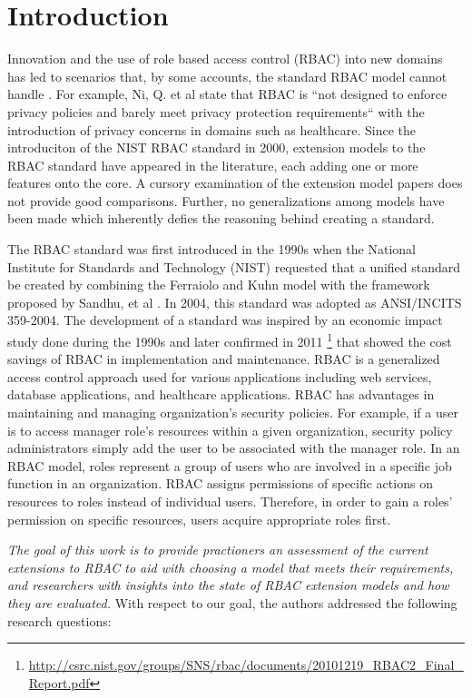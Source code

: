 \section{Introduction} \label{sec:introduction}

Innovation and the use of role based access control (RBAC) into new domains has led to scenarios that, by some accounts, the standard RBAC model cannot handle \cite{kuhn2010adding}.  
For example, Ni, Q. et al \cite{ni2010privacy} state that RBAC is ``not designed to enforce privacy policies and barely 
meet privacy protection requirements`` with the introduction of privacy concerns in domains such as healthcare. 
Since the introduciton of the NIST RBAC standard in 2000, extension models to the RBAC standard have appeared in the literature, each adding one or more features onto the core.  
A cursory examination of the extension model papers does not provide good comparisons. Further, no generalizations among models have been made which inherently defies the reasoning behind
creating a standard.

The RBAC standard was first introduced in the 1990s when the National Institute for Standards and Technology (NIST) 
requested that a unified standard be created by combining the Ferraiolo and Kuhn model \cite{ferraiolokuhn} with the framework 
proposed by Sandhu, et al \cite{sandhu1996role}.  In 2004, this standard was adopted as ANSI/INCITS 359-2004.  The development of a standard was inspired by an economic impact study done 
during the 1990s and later confirmed in 2011 \footnote{\url{http://csrc.nist.gov/groups/SNS/rbac/documents/20101219_RBAC2_Final_Report.pdf}}
that showed the cost savings of RBAC in implementation and maintenance.
RBAC is a generalized access control approach used for various applications including web services, 
database applications, and healthcare applications.  RBAC has advantages in maintaining and managing organization's security policies.  
For example, if a user is to access manager role's resources within a given organization, security policy administrators simply add the user to be associated with the manager role.
In an RBAC model, roles represent a group of users who are involved in a specific job function in an organization. RBAC assigns permissions 
of specific actions on resources to roles instead of individual users. Therefore, in order to gain a roles' permission on specific resources, 
users acquire appropriate roles first.  

\textit{The goal of this work is to provide practioners an assessment of the current extensions to RBAC to aid with choosing a model that meets their requirements, and researchers with insights into the state of RBAC extension models and how they are evaluated.} With respect to our goal, the authors addressed the following research questions:

